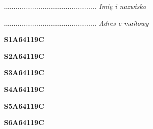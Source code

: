 \begin{turn}{90}\begin{minipage}{\linewidth} \vspace{20mm} ................................................  \textit{Imię i nazwisko}\end{minipage}\end{turn}

\begin{turn}{90}\begin{minipage}{\linewidth} \vspace{20mm} ................................................  \textit{Adres e-mailowy}\end{minipage}\end{turn}

\begin{turn}{90}\huge \begin{minipage}{\linewidth} \vspace{10mm}\textbf{S1A64119C}\end{minipage}\end{turn}

\begin{turn}{90}\huge \begin{minipage}{\linewidth} \vspace{10mm}\textbf{S2A64119C}\end{minipage}\end{turn}

\begin{turn}{90}\huge \begin{minipage}{\linewidth} \vspace{10mm}\textbf{S3A64119C}\end{minipage}\end{turn}

\begin{turn}{90}\huge \begin{minipage}{\linewidth} \vspace{10mm}\textbf{S4A64119C}\end{minipage}\end{turn}

\begin{turn}{90}\huge \begin{minipage}{\linewidth} \vspace{10mm}\textbf{S5A64119C}\end{minipage}\end{turn}

\begin{turn}{90}\huge \begin{minipage}{\linewidth} \vspace{10mm}\textbf{S6A64119C}\end{minipage}\end{turn}

